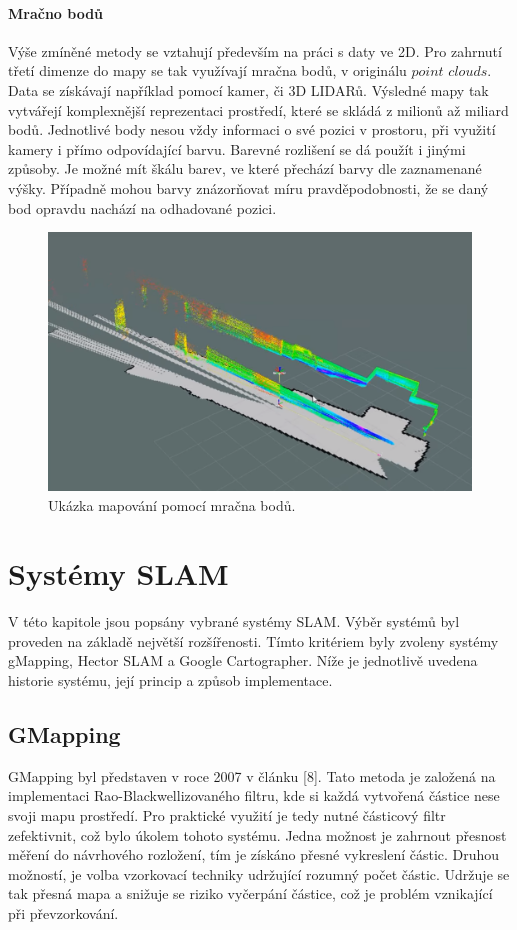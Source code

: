 \documentclass[12pt]{report}
\begin{document}
\subsubsection{Mračno bodů}
Výše zmíněné metody se vztahují především na práci s daty ve 2D. Pro zahrnutí třetí dimenze do mapy se tak využívají mračna bodů, v originálu $point$ $clouds$. Data se získávají například pomocí kamer, či 3D LIDARů. Výsledné mapy tak vytvářejí komplexnější reprezentaci prostředí, které se skládá z milionů až miliard bodů. Jednotlivé body nesou vždy informaci o své pozici v prostoru, při využití kamery i přímo odpovídající barvu. Barevné rozlišení se dá použít i jinými způsoby. Je možné mít škálu barev, ve které přechází barvy dle zaznamenané výšky. Případně mohou barvy znázorňovat míru pravděpodobnosti, že se daný bod opravdu nachází na odhadované pozici.

\begin{figure}[!ht]
	\begin{center}
		\includegraphics[width=0.6\columnwidth]{imgs/point_cloud.png}
	\end{center}
	\caption{Ukázka mapování pomocí mračna bodů.}
	\label{fig:point_cloud}
\end{figure}

\newpage
\chapter{Systémy SLAM}
V této kapitole jsou popsány vybrané systémy SLAM. Výběr systémů byl proveden na základě největší rozšířenosti. Tímto kritériem byly zvoleny systémy gMapping, Hector SLAM a Google Cartographer. Níže je jednotlivě uvedena historie systému, její princip a způsob implementace.

\section{GMapping}
GMapping byl představen v roce 2007 v článku [8]. Tato metoda je založená na implementaci Rao-Blackwellizovaného filtru, kde si každá vytvořená částice nese svoji mapu prostředí. Pro praktické využití je tedy nutné částicový filtr zefektivnit, což bylo úkolem tohoto systému. Jedna možnost je zahrnout přesnost měření do návrhového rozložení, tím je získáno přesné vykreslení částic. Druhou možností, je volba vzorkovací techniky udržující rozumný počet částic. Udržuje se tak přesná mapa a snižuje se riziko vyčerpání částice, což je problém vznikající při převzorkování.\\
\end{document}
